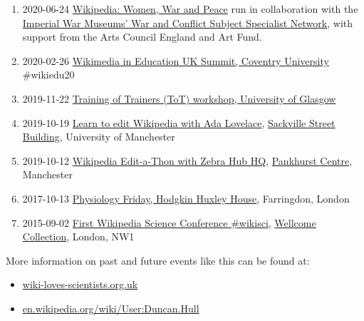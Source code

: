 \documentclass[
  12pt,
]{book}
\providecommand{\tightlist}{%
  \setlength{\itemsep}{0pt}\setlength{\parskip}{0pt}}
\begin{document}
\begin{enumerate}
\def\labelenumi{\arabic{enumi}.}
\tightlist
\item
  2020-06-24 \href{https://en.wikipedia.org/wiki/Wikipedia:Meetup/Women_in_War_and_Peace}{Wikipedia: Women, War and Peace} run in collaboration with the \href{https://www.iwm.org.uk/partnerships/subject-specialist-network}{Imperial War Museums' War and Conflict Subject Specialist Network}, with support from the Arts Council England and Art Fund.
\item
  2020-02-26 \href{https://wikiedusummit.coventry.domains}{Wikimedia in Education UK Summit, Coventry University} \#wikiedu20
\item
  2019-11-22 \href{https://duncan.hull.name/2019/12/10/glasgow/}{Training of Trainers (ToT) workshop, University of Glasgow}
\item
  2019-10-19 \href{https://wiki-loves-scientists.org.uk/2019/10/09/ada/}{Learn to edit Wikipedia with Ada Lovelace}, \href{https://en.wikipedia.org/wiki/Sackville_Street_Building}{Sackville Street Building}, University of Manchester \citep{findingada2019}
\item
  2019-10-12 \href{https://www.eventbrite.com/e/global-wikipedia-edit-a-thon-wikieditathon-2019-manchester-and-london-2019-zebra-hub-hq-the-tickets-48601581639}{Wikipedia Edit-a-Thon with Zebra Hub HQ}, \href{https://en.wikipedia.org/wiki/Pankhurst_Centre}{Pankhurst Centre}, Manchester
\item
  2017-10-13 \href{https://wiki-loves-scientists.org.uk/2017/10/27/mirror-mirror-on-the-wall-who-is-the-most-viewed-of-them-all/}{Physiology Friday, Hodgkin Huxley House}, Farringdon, London \citep{goodbadugly}
\item
  2015-09-02 \href{https://wikimedia.org.uk/wiki/Wikipedia_Science_Conference}{First Wikipedia Science Conference \#wikisci}, \href{https://en.wikipedia.org/wiki/Wellcome_Collection}{Wellcome Collection}, London, NW1 \citep{troubled, Hodson2015}
\end{enumerate}

More information on past and future events like this can be found at:

\begin{itemize}
\tightlist
\item
  \href{https://wiki-loves-scientists.org.uk/}{wiki-loves-scientists.org.uk}
\item
  \href{https://en.wikipedia.org/wiki/User:Duncan.Hull}{en.wikipedia.org/wiki/User:Duncan.Hull}
\end{itemize}
\end{document}
